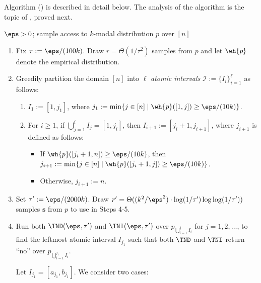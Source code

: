 Algorithm \hyperref[alg:learn-kmodal]{} ()
%
%
%
is described in detail below.
%
%
%
The analysis of the algorithm is the topic of
, proved next.
%

\begin{algorithm}
\medskip

 $\eps> 0$; sample access to $k$-modal
distribution $p$ over $[n]$

\smallskip

\begin{enumerate}

\item Fix $\tau:=\eps/(100k)$. Draw $ r = \Theta(1/\tau^2)$ samples from $p$ and let $\wh{p}$ denote the empirical distribution.


\item Greedily partition the domain $[n]$ into $\ell$ \emph{atomic intervals} $\mathcal{I}:= \{I_i\}_{i=1}^{\ell}$ as follows:
          \begin{enumerate}
          \item[(a) ]$I_1 := [1, j_1]$, where $j_1 := \min\{ j \in [n] \mid \wh{p}([1,j]) \geq \eps/(10k)\}$.
           \item[(b)] For $i \geq 1$, if $\bigcup_{j=1}^i I_j = [1, j_i]$, then $I_{i+1}:=[j_i+1, j_{i+1}]$, where
           $j_{i+1}$ is defined as follows: 
           \begin{itemize}
           \item If $\wh{p}([j_i+1, n]) \geq \eps/(10k)$, then $j_{i+1}: = \min\{ j \in [n] \mid \wh{p}([j_{i}+1, j]) \geq \eps/(10k)\}${.}
           \item Otherwise, $j_{i+1} := n$.
           \end{itemize}           
          \end{enumerate}


\item  Set $\tau' := \eps/(2000k)$.
Draw $r' = \Theta(({k^2} / \eps^3) \cdot \log(1/\tau') \log\log(1/\tau'))$ samples
$\mathbf{s}$ from $p$ to use in Steps 4-5.


\item  Run both $\TND(\eps,\tau')$ and $\TNI(\eps,\tau')$ over $p_{\bigcup_{i=1}^{j} I_i}$ for $j=1,2,\ldots$, to find
the leftmost atomic interval $I_{j_1}$ such that both $\TND$ and $\TNI$ return ``no'' over $p_{\bigcup_{i=1}^{j_1} I_i}$.

Let $I_{j_1} = [a_{j_1},b_{j_1}]$.  We consider two cases:


\end{enumerate}
\end{algorithm}
